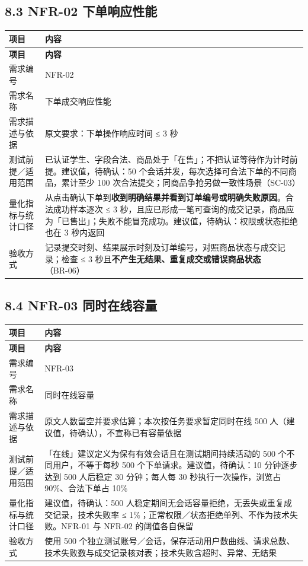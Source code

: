 \documentclass[12pt,a4paper]{ctexart}
\begin{document}
\subsection*{8.3 NFR-02 下单响应性能}

{\footnotesize
\begin{longtable}{|p{2.75cm}|p{13.25cm}|}
\hline
\textbf{项目} & \textbf{内容} \\
\hline
\endfirsthead
\hline
\textbf{项目} & \textbf{内容} \\
\hline
\endhead
\hline
\endfoot
需求编号 & NFR-02 \\
\hline
需求名称 & 下单成交响应性能 \\
\hline
需求描述与依据 & 原文要求：下单操作响应时间 ≤ 3 秒 \\
\hline
测试前提／适用范围 & 已认证学生、字段合法、商品处于「在售」；不把认证等待作为计时前提。建议值，待确认：50 个会话并发，每次选择可合法下单的不同商品，累计至少 100 次合法提交；同商品争抢另做一致性场景（SC-03） \\
\hline
量化指标与统计口径 & 从点击确认下单到\textbf{收到明确结果并看到订单编号或明确失败原因}。合法成功样本逐次 ≤ 3 秒，且应已形成一笔可查询的成交记录，商品应为「已售出」；失败不能冒充成功。建议值，待确认：权限或状态拒绝也在 3 秒内返回 \\
\hline
验收方式 & 记录提交时刻、结果展示时刻及订单编号，对照商品状态与成交记录；检查 ≤ 3 秒且\textbf{不产生无结果、重复成交或错误商品状态}（BR-06） \\
\hline
\end{longtable}
}


\subsection*{8.4 NFR-03 同时在线容量}

{\footnotesize
\begin{longtable}{|p{2.75cm}|p{13.25cm}|}
\hline
\textbf{项目} & \textbf{内容} \\
\hline
\endfirsthead
\hline
\textbf{项目} & \textbf{内容} \\
\hline
\endhead
\hline
\endfoot
需求编号 & NFR-03 \\
\hline
需求名称 & 同时在线容量 \\
\hline
需求描述与依据 & 原文人数留空并要求估算；本次按任务要求暂定同时在线 500 人（建议值，待确认），不宣称已有容量依据 \\
\hline
测试前提／适用范围 & 「在线」建议定义为保有有效会话且在测试期间持续活动的 500 个不同用户，不等于每秒 500 个下单请求。建议值，待确认：10 分钟逐步达到 500 人后稳定 30 分钟；每人每 30 秒执行一次操作，浏览占 90\%、合法下单占 10\% \\
\hline
量化指标与统计口径 & 建议值，待确认：500 人稳定期间无会话容量拒绝，无丢失或重复成交记录，技术失败率 ≤ 1\%；正常权限／状态拒绝单列、不作为技术失败。NFR-01 与 NFR-02 的阈值各自保留 \\
\hline
验收方式 & 使用 500 个独立测试账号／会话，保存活动用户数曲线、请求总数、技术失败数与成交记录核对表；技术失败含超时、异常、无结果 \\
\hline
\end{longtable}
}
\end{document}
